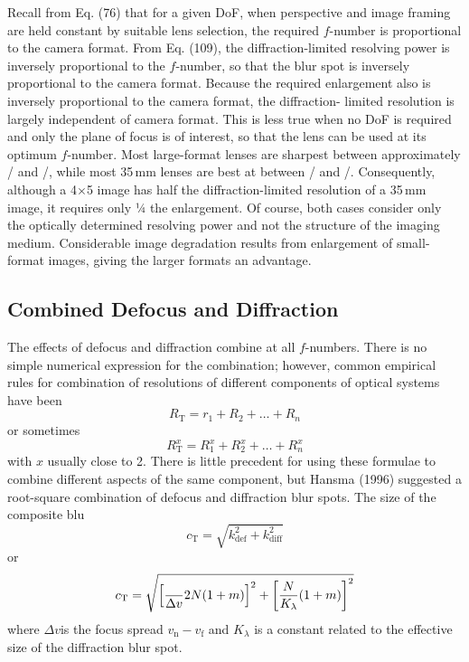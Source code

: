 \documentclass[11pt, oneside]{scrartcl}   	%
\newcommand{\Dv}{\ensuremath{\Delta v}}
\newcommand{\f}[1]{\mbox{\raisebox{2pt}{\footnotesize $f$\hspace{-1.2pt}}/\hspace{-0.6pt}\raisebox{-0.6pt}{\small #1}}}
\begin{document}
Recall from Eq. (76) that for a given DoF, when perspective and
image framing are held constant by suitable lens selection, the
required $f$-number is proportional to the camera format. From
Eq. (109), the diffraction-limited resolving power is inversely
proportional to the $f$-number, so that the blur spot is inversely proportional to the camera format. Because the required enlargement also is inversely proportional to the camera format, the diffraction- limited resolution is largely independent of camera format. This is less true when no DoF is required and only the plane of focus is of interest, so that the lens can be used at its optimum $f$-number. Most large-format lenses are sharpest between approximately \f{16} and \f{22}, while most 35\,mm lenses are best at between \f8 and \f{11}. Consequently, although a 4$\times$5 image has half the diffraction-limited resolution of a 35\,mm image, it requires only 1⁄4 the enlargement. Of course, both cases consider only the optically determined resolving power and not the structure of the imaging medium. Considerable image degradation results from enlargement of small-format images, giving the larger formats an advantage.

\subsection{Combined Defocus and Diffraction}
\label{sec:comb-defoc-diffr}


The effects of defocus and diffraction combine at all
$f$-numbers. There is no simple numerical expression for the
combination; however, common empirical rules for combination of
resolutions of different components of optical systems have been
\begin{equation}
  \label{eq:110}
  R_\mathrm{T}=r_1 + R_2 + \ldots + R_n
\end{equation}
or sometimes
\begin{equation}
  \label{eq:111}
  R^x_\mathrm{T}=R^x_1 + R^x_2 + \ldots + R^x_n
\end{equation}
with $x$ usually close to 2. There is little precedent for using these formulae to combine different aspects of the same component, but Hansma (1996) suggested a root-square combination of defocus and diffraction blur spots. The size of the composite blu
\begin{equation}
  \label{eq:112}
  c_\mathrm{T}=\sqrt{k^2_\mathrm{def}+k^2_\mathrm{diff}}
\end{equation}
or
\begin{equation}
  \label{eq:113}
  c_\mathrm{T} = \sqrt{ \left[ \frac\Dv{2N(1+m)}\right]^2 + \left[\frac N{K_\lambda}(1+m)\right]^2}
\end{equation}
where \Dv is the focus spread $v_\mathrm{n} - v_\mathrm{f}$ and $K_\lambda$ is a constant related to the effective size of the diffraction blur spot.
\end{document}
